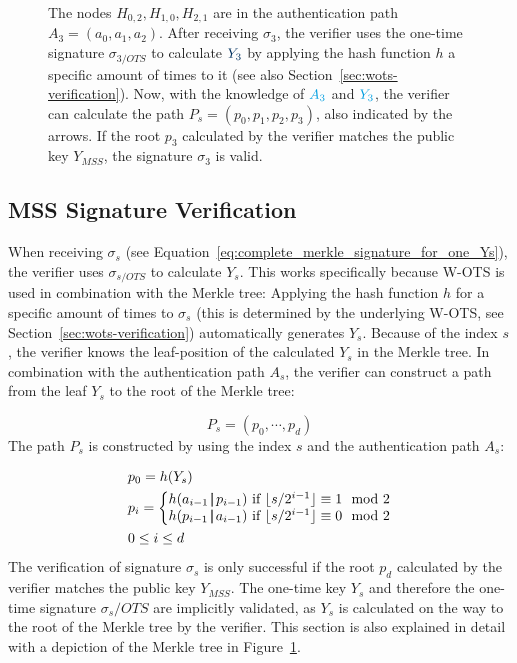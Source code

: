 \begin{figure}
{The nodes $H_{0,2}, H_{1,0}, H_{2,1}$ are in the \textcolor{cyan_tud}{authentication path $A_3 = (a_0, a_1, a_2)$}. After receiving $\sigma_3$, the verifier uses the one-time signature \textcolor{cyan_tud}{$\sigma_{3/OTS}$} to calculate $\textcolor{darkblue_tud}{Y_3}$ by applying the hash function $h$ a specific amount of times to it (see also Section~\ref{sec:wots-verification}).
Now, with the knowledge of $\textcolor{cyan_tud}{A_3}$ and $\textcolor{cyan_tud}{Y_3}$, the verifier can calculate the \textcolor{darkblue_tud}{path $P_s = (p_0, p_1, p_2, p_3)$}, also indicated by the arrows. If the root $p_3$ calculated by the verifier matches the public key $Y_{MSS}$, the signature $\sigma_3$ is valid.}
\label{img:merkle_tree_signature_gen}
\end{figure}


\subsection{MSS Signature Verification}
\label{sec:mss_sign_verif}
When receiving $\sigma_s$ (see Equation~\ref{eq:complete_merkle_signature_for_one_Ys}), the verifier uses $\sigma_{s/OTS}$ to calculate $Y_s$. This works specifically because W-OTS is used in combination with the Merkle tree: Applying the hash function $h$ for a specific amount of times to $\sigma_s$ (this is determined by the underlying W-OTS, see Section~\ref{sec:wots-verification}) automatically generates $Y_s$.
Because of the index $s$, the verifier knows the leaf-position of the calculated $Y_s$ in the Merkle tree. 
In combination with the authentication path $A_s$, the verifier can construct a path from the leaf $Y_s$ to the root of the Merkle tree: 

\begin{equation}
P_s = (p_0, \cdots, p_d)
\end{equation}
The path $P_s$ is constructed by using the index $s$ and the authentication path $A_s$:

\begin{align}
\label{eq:merkle_verifier_path_calculation}
&p_0 = h(Y_s) \\
&p_{i} = 
\left\{\begin{matrix} \nonumber
h(a_{i-1} \operatorname{|\!\!|} p_{i-1}) \text{ if } \lfloor s/2^{i-1}\rfloor \equiv 1 \mod{2} \\
h(p_{i-1} \operatorname{|\!\!|} a_{i-1}) \text{ if } \lfloor s/2^{i-1}\rfloor \equiv 0 \mod{2}
\end{matrix}\right.  \nonumber \\
&0 \leq i \leq d  \nonumber 
\end{align}
The verification of signature $\sigma_s$ is only successful if the root $p_d$ calculated by the verifier matches the public key $Y_{MSS}$. The one-time key $Y_s$ and therefore the one-time signature $\sigma_s/OTS$ are implicitly validated, as $Y_s$ is calculated on the way to the root of the Merkle tree by the verifier.
This section is also explained in detail with a depiction of the Merkle tree in Figure~\ref{img:merkle_tree_signature_gen}.


